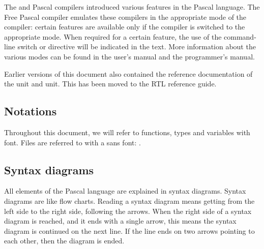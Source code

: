 The \tp and \delphi Pascal compilers introduced various features in the
Pascal language. The Free Pascal compiler emulates these compilers in the
appropriate mode of the compiler: certain features are available only
if the compiler is switched to the appropriate mode. When required for
a certain feature, the use of the  command-line switch or
 directive will be indicated in the text. More information
about the various modes can be found in the user's manual and the
programmer's manual.

Earlier versions of this document also contained the reference documentation
of the  unit and  unit. This has been moved to the
RTL reference guide.

\subsection*{Notations}
Throughout this document, we will refer to functions, types and variables
with  font. Files are referred to with a sans font:
.

\subsection*{Syntax diagrams}
All elements of the Pascal language are explained in syntax diagrams.
Syntax diagrams are like flow charts. Reading a syntax diagram means getting
from the left side to the right side, following the arrows.
When the right side of a syntax diagram is reached, and it ends with a single
arrow, this means the syntax diagram is continued on the next line. If
the line ends on two arrows pointing to each other, then the diagram is
ended.


